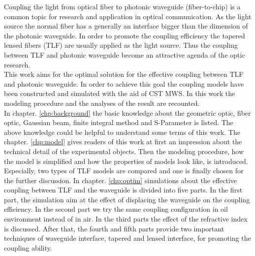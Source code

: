 
Coupling the light from optical fiber to photonic waveguide (fiber-to-chip) is a common topic for research and application in optical communication. As the light source the normal fiber has a generally an interface bigger than the dimension of the photonic waveguide. In order to promote the coupling efficiency the tapered lensed fibers (TLF) are usually applied as the light source. Thus the coupling between TLF and photonic waveguide become an attractive agenda of the optic research. \\ 

This work aims for the optimal solution for the effective coupling between TLF and photonic waveguide. In order to achieve this goal the coupling models have been constructed and simulated with the aid of CST MWS. In this work the modeling procedure and the analyses of the result are recounted.\\

In chapter. \ref{chp:background} the basic knowledge about the geometric optic, fiber optic, Gaussian beam, finite integral method and S-Parameter is listed. The above knowledge could be helpful to understand some terms of this work. The chapter. \ref{chp:model} gives readers of this work at first an impression about the technical detail of the experimental objects. Then the modeling procedure, how the model is simplified and how the properties of models look like, is introduced. Especially, two types of TLF models are compared and one is finally chosen for the further discussion. In chapter. \ref{chp:optim} simulations about the effective coupling between TLF and the waveguide is divided into five parts. In the first part, the simulation aim at the effect of displacing the waveguide on the coupling efficiency. In the second part we try the same coupling configuration in oil environment instead of in air. In the third parts the effect of the refractive index is discussed. After that, the fourth and fifth parts provide two important techniques of waveguide interface, tapered and lensed interface, for promoting the coupling ability.\\        
 
